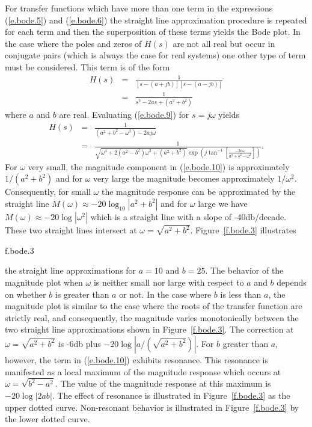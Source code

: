 	For transfer functions which have more than one term
in the expressions (\ref{e.bode.5}) and (\ref{e.bode.6}) the
straight line approximation procedure is repeated for each
term and then the superposition
of these terms yields the Bode plot.  In the case
where the  poles and zeros of $H(s)$ are not all real
but occur in conjugate pairs (which is always the case
for real systems) one other type of term must be considered.
This term is of the form
%
\begin{eqnarray}
H(s)&=&\frac{1}{[s-(a+jb)][s-(a-jb)]}\nonumber\\
    &=&\frac{1}{s^2-2as+(a^2+b^2)}
\label{e.bode.9}
\end{eqnarray}
%
where $a$ and $b$ are real.  Evaluating (\ref{e.bode.9}) for $s=j\omega$
yields
%
\begin{eqnarray}
H(s)&=&\frac{1}{(a^2+b^2-\omega^2)-2aj\omega}\nonumber\\
    &=&\frac{1}{\sqrt{\omega^4+2(a^2-b^2)\omega^2+(a^2+b^2)}\exp(j\tan^{-1}[\frac{-2a\omega}{a^2+b^2-\omega^2}])}.
\label{e.bode.10}
\end{eqnarray}
%
For $\omega$ very small, the magnitude component in (\ref{e.bode.10}) is
approximately $1/(a^2+b^2)$ and for $\omega$ very large the magnitude
becomes approximately $1/\omega^2$.  Consequently, for small $\omega$
the magnitude response can be approximated by the straight line 
$M(\omega)\approx-20\log_{10}|a^2+b^2|$ and for $\omega$ large we have
$M(\omega)\approx-20\log|\omega^2|$ which is a 
straight line with a slope of -40db/decade.  These two straight lines
intersect at $\omega=\sqrt{a^2+b^2}$.  Figure~\ref{f.bode.3} illustrates
%

{f.bode.3}

%
the straight line approximations for $a=10$ and $b=25$.  The behavior of
the magnitude plot when $\omega$ is neither small nor large with
respect to $a$ and $b$ depends on whether $b$ is greater than
$a$ or not.  In the case where $b$ is less than $a$, the
magnitude plot is similar to the case where the roots of the transfer
function are strictly real, and consequently, the magnitude varies 
monotonically between the two straight line approximations
shown in Figure~\ref{f.bode.3}.  The correction at $\omega=\sqrt{a^2+b^2}$
is -6db plus $-20\log|a/(\sqrt{a^2+b^2})|$.  For $b$ greater than $a$,
however, the term in (\ref{e.bode.10}) exhibits resonance.  This 
resonance is manifested as a local maximum of the magnitude response
which occurs at $\omega=\sqrt{b^2-a^2}$.  The value of the magnitude
response at this maximum is $-20\log|2ab|$.  The effect of resonance
is illustrated in Figure~\ref{f.bode.3} as the upper dotted curve. 
Non-resonant behavior is illustrated in Figure~\ref{f.bode.3} by the
lower dotted curve.

